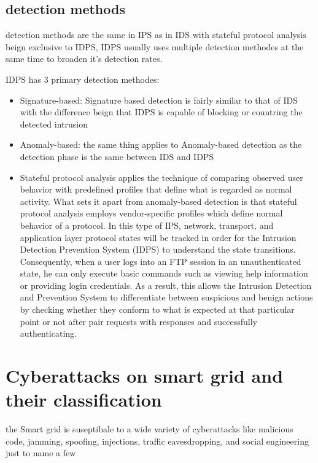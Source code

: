 \subsection{detection methods}

detection methods are the same in IPS as in IDS with stateful protocol analysis beign exclusive to IDPS, IDPS usually uses multiple detection methodes at the same time to broaden it's detection rates. \cite{NIST-IDPS}

IDPS has 3 primary detection methodes:


\begin{itemize}
	\item Signature-based: Signature based detection is fairly similar to that of IDS with the difference beign that IDPS is capable of blocking or countring the detected intrusion
	\item Anomaly-based: the same thing applies to Anomaly-based detection as the detection phase is the same between IDS and IDPS
	\item Stateful protocol analysis applies the technique of comparing observed user behavior with predefined profiles that define what is regarded as normal activity. What sets it apart from anomaly-based detection is that stateful protocol analysis employs vendor-specific profiles which define normal behavior of a protocol. In this type of IPS, network, transport, and application layer protocol states will be tracked in order for the Intrusion Detection Prevention System (IDPS) to understand the state transitions. Consequently, when a user logs into an FTP session in an unauthenticated state, he can only execute basic commands such as viewing help information or providing login credentials. As a result, this allows the Intrusion Detection and Prevention System to differentiate between suspicious and benign actions by checking whether they conform to what is expected at that particular point or not after pair requests with responses and successfully authenticating. \cite{NIST-IDPS19-20}
	

\end{itemize}









\section{Cyberattacks on smart grid and their classification}
the Smart grid is suseptibale to a wide variety of cyberattacks like malicious code, jamming, spoofing, injections, traffic eavesdropping, and social engineering just to name a few

